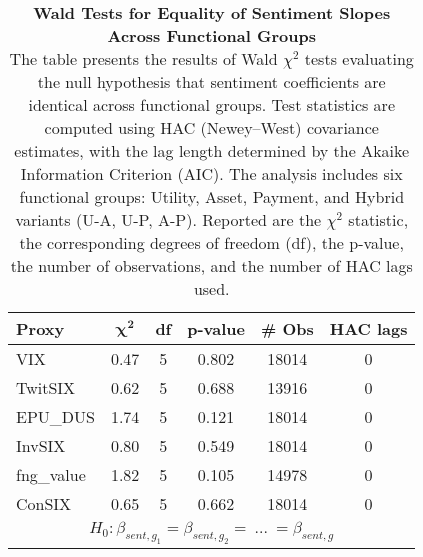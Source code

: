\begin{table}[ht]
\centering
\scriptsize
\setlength{\tabcolsep}{4pt}
\begin{tabular}{l c c c c c}
\toprule
\textbf{Proxy} & \(\boldsymbol{\chi^2}\) & \textbf{df} & \textbf{p-value} & \textbf{\# Obs} & \textbf{HAC lags} \\
\midrule
VIX & 0.47 & 5 & 0.802 & 18014 & 0 \\
TwitSIX & 0.62 & 5 & 0.688 & 13916 & 0 \\
EPU\_DUS & 1.74 & 5 & 0.121 & 18014 & 0 \\
InvSIX & 0.80 & 5 & 0.549 & 18014 & 0 \\
fng\_value & 1.82 & 5 & 0.105 & 14978 & 0 \\
ConSIX & 0.65 & 5 & 0.662 & 18014 & 0 \\
\midrule
\multicolumn{6}{c}{$H_0 : \beta_{sent,g_1} = \beta_{sent,g_2}=\ ...\ =\beta_{sent,g}$}\\
\bottomrule
\end{tabular}
\caption{\textbf{Wald Tests for Equality of Sentiment Slopes Across Functional Groups}\\ The table presents the results of Wald $\chi^2$ tests evaluating the null hypothesis that sentiment coefficients are identical across functional groups. Test statistics are computed using HAC (Newey--West) covariance estimates, with the lag length determined by the Akaike Information Criterion (AIC). The analysis includes six functional groups: Utility, Asset, Payment, and Hybrid variants (U-A, U-P, A-P). Reported are the $\chi^2$ statistic, the corresponding degrees of freedom (df), the p-value, the number of observations, and the number of HAC lags used.}
\label{tab:h2_wald_tests}
\end{table}